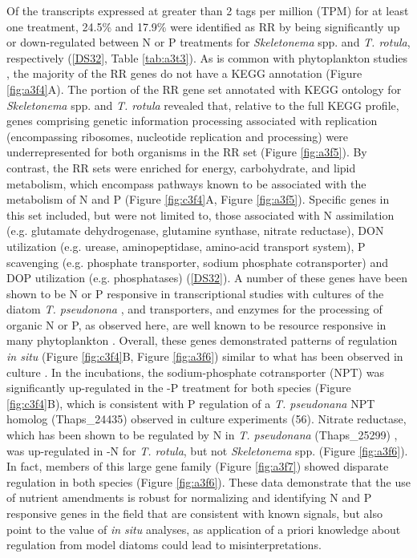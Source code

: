 Of the transcripts expressed at greater than 2 tags per million (TPM) for at least one treatment, 24.5\% and 17.9\% were identified as RR by being significantly up or down-regulated between N or P treatments for \textit{Skeletonema} spp. and \textit{T. rotula}, respectively (\ref{DS32}, Table \ref{tab:a3t3}). As is common with phytoplankton studies \citep{Marchetti2012a}, the majority of the RR genes do not have a KEGG annotation (Figure \ref{fig:a3f4}A). The portion of the RR gene set annotated with KEGG ontology for \textit{Skeletonema} spp. and \textit{T. rotula} revealed that, relative to the full KEGG profile, genes comprising genetic information processing associated with replication (encompassing ribosomes, nucleotide replication and processing) were underrepresented for both organisms in the RR set (Figure \ref{fig:a3f5}). By contrast, the RR sets were enriched for energy, carbohydrate, and lipid metabolism, which encompass pathways known to be associated with the metabolism of N and P (Figure \ref{fig:c3f4}A, Figure \ref{fig:a3f5}). Specific genes in this set included, but were not limited to, those associated with N assimilation (e.g. glutamate dehydrogenase, glutamine synthase, nitrate reductase), DON utilization (e.g. urease, aminopeptidase, amino-acid transport system), P scavenging (e.g. phosphate transporter, sodium phosphate cotransporter) and DOP utilization (e.g. phosphatases) (\ref{DS32}). A number of these genes have been shown to be N or P responsive in transcriptional studies with cultures of the diatom \textit{T. pseudonona} \citep{Dyhrman2012, Bender2014}, and transporters, and enzymes for the processing of organic N or P, as observed here, are well known to be resource responsive in many phytoplankton \citep{Dyhrman2012, Wurch2011, Dyhrman2006, Bruhn2010}. Overall, these genes demonstrated patterns of regulation \textit{in situ} (Figure \ref{fig:c3f4}B, Figure \ref{fig:a3f6}) similar to what has been observed in culture \citep{Dyhrman2012, Bender2014}. In the incubations, the sodium-phosphate cotransporter (NPT) was significantly up-regulated in the -P treatment for both species (Figure \ref{fig:c3f4}B), which is consistent with P regulation of a \textit{T. pseudonana} NPT homolog (Thaps\_24435) observed in culture experiments (56). Nitrate reductase, which has been shown to be regulated by N in \textit{T. pseudonana} (Thaps\_25299) \citep{Bender2012}, was up-regulated in -N for \textit{T. rotula}, but not \textit{Skeletonema} spp. (Figure \ref{fig:a3f6}). In fact, members of this large gene family (Figure \ref{fig:a3f7}) showed disparate regulation in both species (Figure \ref{fig:a3f6}).  These data demonstrate that the use of nutrient amendments is robust for normalizing and identifying N and P responsive genes in the field that are consistent with known signals, but also point to the value of \textit{in situ} analyses, as application of a priori knowledge about regulation from model diatoms could lead to misinterpretations.\par

